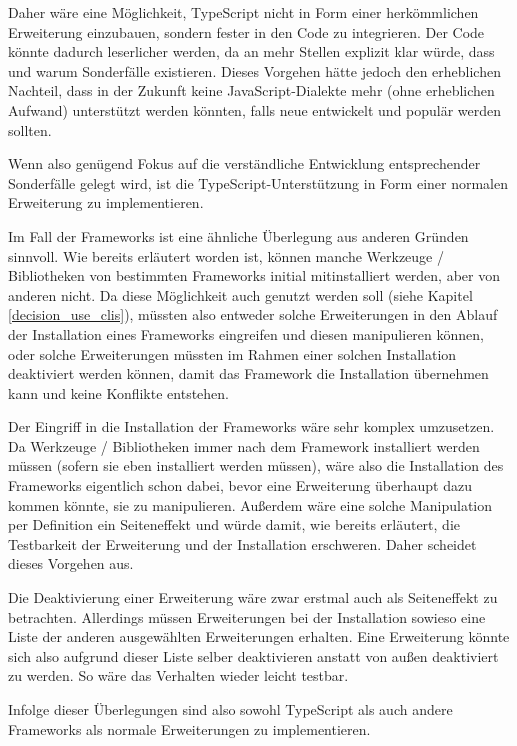 Daher wäre eine Möglichkeit, TypeScript nicht in Form einer herkömmlichen Erweiterung einzubauen, sondern fester in den Code zu integrieren. Der Code könnte dadurch leserlicher werden, da an mehr Stellen explizit klar würde, dass und warum Sonderfälle existieren. Dieses Vorgehen hätte jedoch den erheblichen Nachteil, dass in der Zukunft keine JavaScript-Dialekte mehr (ohne erheblichen Aufwand) unterstützt werden könnten, falls neue entwickelt und populär werden sollten.

Wenn also genügend Fokus auf die verständliche Entwicklung entsprechender Sonderfälle gelegt wird, ist die TypeScript-Unterstützung in Form einer normalen Erweiterung zu implementieren.

Im Fall der Frameworks ist eine ähnliche Überlegung aus anderen Gründen sinnvoll. Wie bereits erläutert worden ist, können manche Werkzeuge / Bibliotheken von bestimmten Frameworks initial mitinstalliert werden, aber von anderen nicht. Da diese Möglichkeit auch genutzt werden soll (siehe Kapitel \ref{decision_use_clis}), müssten also entweder solche Erweiterungen in den Ablauf der Installation eines Frameworks eingreifen und diesen manipulieren können, oder solche Erweiterungen müssten im Rahmen einer solchen Installation deaktiviert werden können, damit das Framework die Installation übernehmen kann und keine Konflikte entstehen.

Der Eingriff in die Installation der Frameworks wäre sehr komplex umzusetzen. Da Werkzeuge / Bibliotheken immer nach dem Framework installiert werden müssen (sofern sie eben installiert werden müssen), wäre also die Installation des Frameworks eigentlich schon dabei, bevor eine Erweiterung überhaupt dazu kommen könnte, sie zu manipulieren. Außerdem wäre eine solche Manipulation per Definition ein Seiteneffekt und würde damit, wie bereits erläutert, die Testbarkeit der Erweiterung und der Installation erschweren. Daher scheidet dieses Vorgehen aus.

Die Deaktivierung einer Erweiterung wäre zwar erstmal auch als Seiteneffekt zu betrachten. Allerdings müssen Erweiterungen bei der Installation sowieso eine Liste der anderen ausgewählten Erweiterungen erhalten. Eine Erweiterung könnte sich also aufgrund dieser Liste selber deaktivieren anstatt von außen deaktiviert zu werden. So wäre das Verhalten wieder leicht testbar.

Infolge dieser Überlegungen sind also sowohl TypeScript als auch andere Frameworks als normale Erweiterungen zu implementieren.

